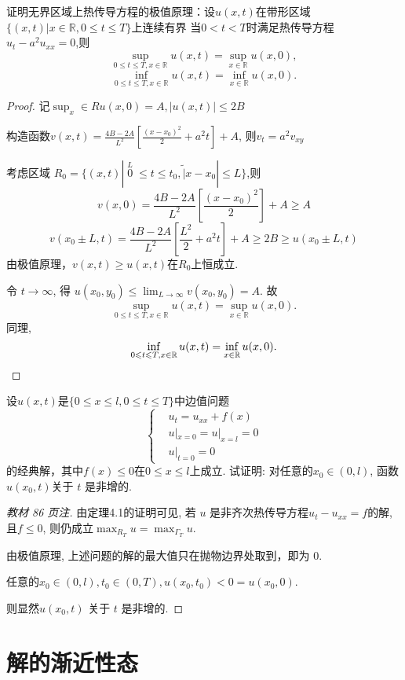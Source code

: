 \begin{exercise}
	证明无界区域上热传导方程的极值原理：设$u(x,t)$在带形区域$\{(x,t)|x\in\mathbb{R},0\leq t\leq T\}$上连续有界
	当$0<t<T$时满足热传导方程$u_t-a^2u_{xx}=0$,则
	$$\sup_{0\leq t\leq T,x\in \mathbb{R}}u(x,t)=\sup_{x\in \mathbb{R}}u(x,0),$$
	$$\inf_{0\leq t\leq T,x\in \mathbb{R}}u(x,t)=\inf_{x\in \mathbb{R}}u(x,0).$$
\end{exercise}

\begin{proof}
	记$\sup_x\in Ru(x,0)=A,|u(x,t)|\leq2B$
	
	构造函数$v(x,t)=\frac{4B-2A}{L^{2}}[\frac{(x-x_{0})^{2}}{2}+a^{2}t]+A$, 则$v_t=a^2v_{xy}$
	
	考虑区域 $R_0=\{(x,t)|\overset{L}{\operatorname*{\operatorname*{0}}}\leq t\leq t_{0},\tilde{|}x-x_{0}|\leq L\}$,则
	$$v(x,0)=\frac{4B-2A}{L^2}[\frac{(x-x_0)^2}{2}]+A\geq A$$
	$$v(x_0\pm L,t)=\frac{4B-2A}{L^2}\left[\frac{L^2}{2}+a^2t\right]+A\geq2B\geq u(x_0\pm L,t)$$
	由极值原理，$v(x,t)\geq u(x,t)$在$R_0$上恒成立.
	
	令 $t\to \infty$, 得 $u( x_{0}, y_{0}) \leq \lim _{L\to \infty }v( x_{0}, y_{0}) = A$.
	故
	$$\sup_{0\leq t\leq T,x\in\mathbb{R}}u(x,t)=\sup_{x\in\mathbb{R}}u(x,0).$$
	同理,
	\[\inf_{0\leq t\leq T,x\in\mathbb{R}}u(x,t)=\inf_{x\in\mathbb{R}}u(x,0).\qedhere\]
\end{proof}


\begin{exercise}[6]
	设$u(x,t)$是$\{0\leq x\leq l,0\leq t\leq T\}$中边值问题
	$$\begin{cases}&u_t=u_{xx}+f(x)\\&u|_{x=0}=u|_{x=l}=0\\&u|_{t=0}=0\end{cases}$$
	的经典解，其中$f(x)\leq0$在$0\leq x\leq l$上成立. 试证明: 对任意的$x_0\in(0,l)$, 函数$u(x_0,t)$关于 $t$ 是非增的.
\end{exercise}

\begin{proof}
	[教材 86 页注]
	由定理4.1的证明可见, 若 $u$ 是非齐次热传导方程$u_t-u_{xx}=f$的解, 且$f\leq0$, 则仍成立$\displaystyle\max_{R_T}u=\max_{\varGamma_T}u$.

	由极值原理, 上述问题的解的最大值只在抛物边界处取到，即为 $0$.
	
	任意的$x_0\in(0,l), t_0\in(0,T), u(x_0,t_0)<0=u(x_0,0)$.
	
	则显然$u(x_0,t)$ 关于 $t$ 是非增的.
\end{proof}
\newpage
\section{解的渐近性态}

